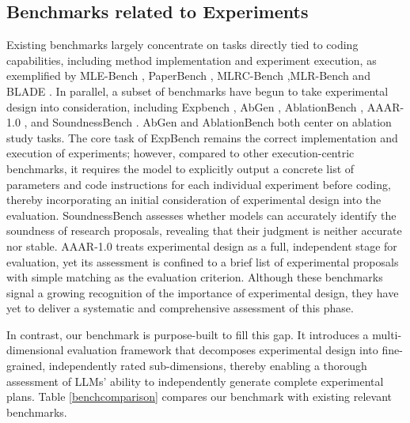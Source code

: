 \documentclass[letterpaper]{article} %
\begin{document}
\subsection{Benchmarks related to Experiments}
Existing benchmarks largely concentrate on tasks directly tied to coding capabilities, including method 
implementation and experiment execution, as exemplified by MLE-Bench \cite{chan2025mle}, PaperBench \cite{starace2025paperbench}, 
MLRC-Bench \cite{zhang2026mlrc},MLR-Bench \cite{chen2026mlr} and BLADE \cite{gu2024blade}.
In parallel, a subset of benchmarks have begun to take experimental design into consideration, 
including Expbench \cite{kon2025exp}, AbGen \cite{zhao2025abgen}, AblationBench \cite{abramovich2025ablationbench}, AAAR-1.0 \cite{lou2024aaar}, and SoundnessBench \cite{ho2026soundnessbench}.
AbGen and AblationBench both center on ablation study tasks. The core task of ExpBench remains the correct implementation and execution of experiments; 
however, compared to other execution-centric benchmarks, it requires the model to explicitly output a concrete list of parameters and code instructions for each 
individual experiment before coding, thereby incorporating an initial consideration of experimental design into the evaluation. 
SoundnessBench assesses whether models can accurately identify the soundness of research proposals, revealing that their judgment is neither accurate nor stable. 
AAAR-1.0 treats experimental design as a full, independent stage for evaluation, yet its assessment is confined to a brief list of experimental proposals with simple 
matching as the evaluation criterion. Although these benchmarks signal a growing recognition of the importance of experimental design, they have yet to deliver 
a systematic and comprehensive assessment of this phase.

In contrast, our benchmark is purpose-built to fill this gap. It introduces a multi-dimensional evaluation framework that decomposes experimental design into fine-grained, 
independently rated sub-dimensions, thereby enabling a thorough assessment of LLMs' ability to independently generate complete experimental plans. 
Table \ref{benchcomparison} compares our benchmark with existing relevant benchmarks.

\end{document}
